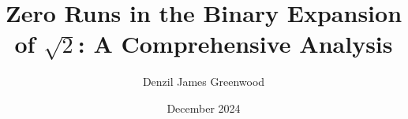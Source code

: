 



\title{Zero Runs in the Binary Expansion of $\sqrt{2}$: A Comprehensive Analysis}
\author{Denzil James Greenwood}
\date{December 2024}



\maketitle










